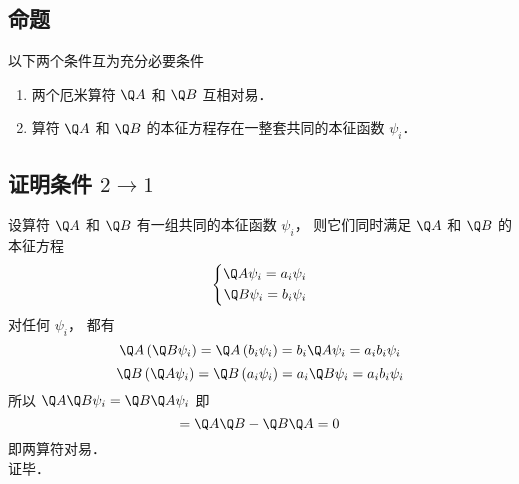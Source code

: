 
\subsection{命题}
以下两个条件互为充分必要条件
\begin{enumerate}
  \item 两个厄米算符 $\Q A$ 和 $\Q B$ 互相对易．
  \item 算符 $\Q A$ 和 $\Q B$ 的本征方程存在一整套共同的本征函数 ${\psi _i}$．
\end{enumerate}
\subsection{证明条件 $2 \to 1$}
设算符 $\Q A$ 和 $\Q B$ 有一组共同的本征函数 ${\psi _i}$，  则它们同时满足 $\Q A$ 和 $\Q B$ 的本征方程
\begin{equation}
  \left\{ \begin{aligned}
\Q A{\psi _i} = {a_i}{\psi _i}\\
\Q B{\psi _i} = {b_i}{\psi _i}
\end{aligned} \right.
\end{equation}
对任何 ${\psi _i}$，  都有
\begin{equation}
  \Q A\left( {\Q B{\psi _i}} \right) = \Q A\left( {{b_i}{\psi _i}} \right) = {b_i}\Q A{\psi _i} = {a_i}{b_i}{\psi _i}
\end{equation}
\begin{equation}
  \Q B\left( {\Q A{\psi _i}} \right) = \Q B\left( {{a_i}{\psi _i}} \right) = {a_i}\Q B{\psi _i} = {a_i}{b_i}{\psi _i}
\end{equation}
所以 $\Q A\Q B{\psi _i} = \Q B\Q A{\psi _i}$ 即
\begin{equation}
[\Q A,\Q B] = \Q A\Q B - \Q B\Q A = 0
\end{equation}
即两算符对易．\\
证毕．
